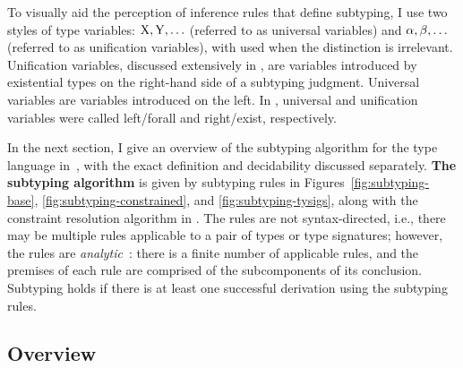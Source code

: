 

To visually aid the perception of inference rules that define subtyping,
I use two styles of type variables: $\mathrm{X}, \mathrm{Y}, \ldots$ (referred to as
universal variables) and $\alpha, \beta, \ldots$ (referred to as unification
variables), with \vany used when the distinction is irrelevant.
{Unification} variables, discussed extensively
in , are variables introduced by existential
types on the right-hand side of a subtyping judgment.
Universal variables are variables introduced on the left.
In , universal and unification variables
were called left/forall and right/exist, respectively.

In the next section, I give an overview of the subtyping
algorithm for the type language in~,
with the exact definition and decidability discussed separately.
\textbf{The subtyping algorithm} is given by subtyping rules in
Figures~\ref{fig:subtyping-base}, \ref{fig:subtyping-constrained}, and
\ref{fig:subtyping-tysigs},
along with the constraint resolution algorithm in .
The rules are not syntax-directed, i.e., there may be multiple rules
applicable to a pair of types or type signatures; however, the rules
are \emph{analytic}~\cite{bib:martin-lof:analytic-synthetic:1994}:
there is a finite number of applicable rules, and the premises of each rule
are comprised of the subcomponents of its conclusion.
Subtyping holds if there is at least one successful derivation using
the subtyping rules.


\subsection{Overview}

